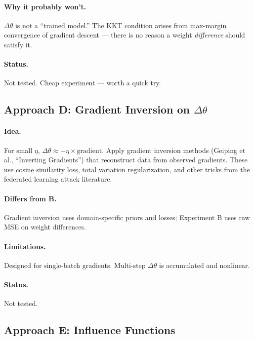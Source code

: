 \documentclass[11pt,a4paper]{article}
\begin{document}
\paragraph{Why it probably won't.} $\Delta\theta$ is not a ``trained model.'' The KKT condition arises from max-margin convergence of gradient descent — there is no reason a weight \emph{difference} should satisfy it.

\paragraph{Status.} \colorbox{yellow!30}{Not tested.} Cheap experiment — worth a quick try.

\subsection{Approach D: Gradient Inversion on $\Delta\theta$}

\paragraph{Idea.} For small $\eta$, $\Delta\theta \approx -\eta \times \text{gradient}$. Apply gradient inversion methods (Geiping et al., ``Inverting Gradients'') that reconstruct data from observed gradients. These use cosine similarity loss, total variation regularization, and other tricks from the federated learning attack literature.

\paragraph{Differs from B.} Gradient inversion uses domain-specific priors and losses; Experiment B uses raw MSE on weight differences.

\paragraph{Limitations.} Designed for single-batch gradients. Multi-step $\Delta\theta$ is accumulated and nonlinear.

\paragraph{Status.} \colorbox{yellow!30}{Not tested.}

\subsection{Approach E: Influence Functions}
\end{document}
